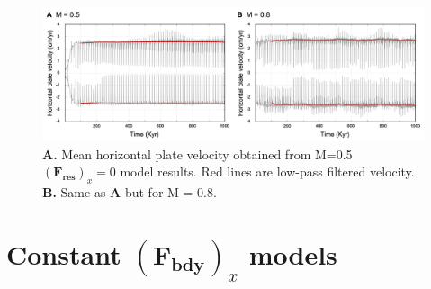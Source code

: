 \documentclass[letterpaper,12pt,notitle]{memphisthesis}                     %
\begin{document}
%
\begin{figure}[!htb]
	\centering
	\includegraphics[width=0.98\linewidth,trim=4 4 4 4,clip]{./figs/f0mhv.png}
	\caption{\textbf{A.} Mean horizontal plate velocity obtained from M=0.5 $(\boldsymbol{F_{res}})_x=0$ model results. Red lines are low-pass filtered velocity. \textbf{B.} Same as \textbf{A} but for M = 0.8. }
	\label{fig:f0mhv}
\end{figure}

\section{Constant $(\boldsymbol{F_{bdy}})_x$ models}
\end{document}
